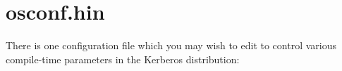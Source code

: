 \documentclass[letterpaper,10pt,english]{sphinxmanual}
\begin{document}
%
\begin{sphinxVerbatim}[commandchars=\\\{\}]
   \PYGZbs{}
    \PYGZbs{}
   
\end{sphinxVerbatim}


\section{osconf.hin}
\label{\detokenize{build/osconf:osconf-hin}}\label{\detokenize{build/osconf::doc}}
There is one configuration file which you may wish to edit to control
various compile-time parameters in the Kerberos distribution:

%
\begin{sphinxVerbatim}[commandchars=\\\{\}]
\end{sphinxVerbatim}
\end{document}
